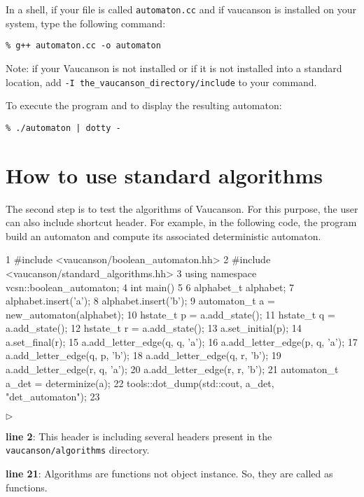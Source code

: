 \documentclass{article}
\begin{document}
In a shell, if your file is called \verb!automaton.cc! and
if vaucanson is installed on your system,
type the following command:

\begin{verbatim}
% g++ automaton.cc -o automaton
\end{verbatim}

Note: if your Vaucanson is not installed or if it is not installed
into a standard location, add \verb!-I the_vaucanson_directory/include!
to your command.

To execute the program and to display the resulting automaton:

\begin{verbatim}
% ./automaton | dotty -
\end{verbatim}

\section{How to use standard algorithms}

The second step is to test the algorithms of Vaucanson. For this
purpose, the user can also include shortcut header. For example, in
the following code, the program build an automaton and compute its
associated deterministic automaton.

\begin{code}
1  #include <vaucanson/boolean_automaton.hh>
2  #include <vaucanson/standard_algorithms.hh>
3  using namespace vcsn::boolean_automaton;
4  int main()
5  {
6    alphabet_t alphabet;
7    alphabet.insert('a');
8    alphabet.insert('b');
9    automaton_t a = new_automaton(alphabet);
10   hstate_t p = a.add_state();
11   hstate_t q = a.add_state();
12   hstate_t r = a.add_state();
13   a.set_initial(p);
14   a.set_final(r);
15   a.add_letter_edge(q, q, 'a');
16   a.add_letter_edge(p, q, 'a');
17   a.add_letter_edge(q, p, 'b');
18   a.add_letter_edge(q, r, 'b');
19   a.add_letter_edge(r, q, 'a');
20   a.add_letter_edge(r, r, 'b');
21   automaton_t a_det = determinize(a);
22   tools::dot_dump(std::cout, a_det, "det_automaton");
23 }
\end{code}

\begin{list}{$\triangleright$}{}
\item \textbf{line 2}: This header is including several headers present
in the \verb!vaucanson/algorithms! directory.
\item \textbf{line 21}: Algorithms are functions not object instance.
  So, they are called as functions.
\end{list}
\end{document}

